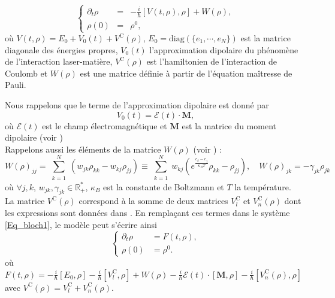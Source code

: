\documentclass[a4paper]{article}
\newcommand{\dt}{\partial_{t}}
\newcommand{\rC}{\mathrm{C}}
\newcommand{\diag}{{\mathrm{diag}}}
\begin{document}
\begin{itemize}
\begin{equation}
\left\{
\begin{array}{rcl}
\dt \rho &=& -\frac{i}{\hbar}\left[ V(t,\rho),\rho\right] + W(\rho), \\
\rho(0) &=& \rho^0,
\end{array}
 \right.
\label{Eq_bloch1}
\end{equation}
où $V(t,\rho) = E_0 + V_0(t) + V^{\rC}(\rho)$, $E_0 =\diag(\{ e_1,\cdots,e_N\})$  est la matrice diagonale des énergies propres, $V_0(t)$  l'approximation dipolaire du phénomène de l'interaction laser-matière,  $V^{\rC}(\rho)$ est l'hamiltonien de l'interaction de Coulomb et $W(\rho)$ est une matrice définie à partir de l'équation maîtresse de Pauli.


Nous rappelons que le terme de l'approximation dipolaire est donné par 
\begin{equation*}
 V_0(t)=\mathcal{E}(t)\cdot \textbf{M},
\end{equation*}  
où $\mathcal{E}(t)$ est le champ électromagnétique et $\textbf{M}$ est la matrice du moment dipolaire (voir \cite{Bidegaray-Bourgeade-Reignier01, Keita-Dicko24}) 
\\Rappelons aussi  les éléments de la matrice $W(\rho)$ (voir \cite{Bidegaray-Bourgeade-Reignier01,Keita-Dicko24}) :
\begin{equation*}
W(\rho)_{jj} = \sum_{\substack{k=1}}^{N} \left( w_{jk} \rho_{kk} - w_{kj} \rho_{jj} \right) \equiv \sum_{\substack{k=1}}^{N} w_{kj}\left( e^{\frac{e_k -e_j}{\kappa_B T}} \rho_{kk} -  \rho_{jj} \right) , \quad
W(\rho)_{jk} = -\gamma_{jk} \rho_{jk}
\end{equation*}
où $\forall j,k $, $w_{jk}, \gamma_{jk} \in \mathbb{R}_{+}^{*}$, $\kappa_B$ est la constante de Boltzmann et $T$ la température.
\\La matrice $V^{\rC}(\rho)$ correspond à la somme de deux matrices $ V_{l}^{\rC}$ et $V^{\rC}_{n} (\rho)$ dont les expressions sont données dans \cite{Bidegaray-Keita14}. En remplaçant ces termes dans le système \eqref{Eq_bloch1}, le modèle peut s'écrire ainsi
\begin{equation}
\left\{
\begin{aligned}
 \dt \rho &= F(t,\rho) , \\
\rho(0) &= \rho^0.
\end{aligned}
 \right.
\label{Eq_bloch2}
\end{equation}
où $F(t,\rho)=-\frac{i}{\hbar}\left[ E_0,\rho\right] -\frac{i}{\hbar}\left[ V_{l}^{\rC},\rho\right] + W(\rho) -\frac{i}{\hbar}\mathcal{E}(t) \cdot \left[ \textbf{M},\rho\right] - \frac{i}{\hbar}\left[ V^{\rC}_{n} (\rho),\rho\right]$ avec  $V^{\rC} (\rho)=V_{l}^{\rC}+V_{n}^{\rC}(\rho)$.

\end{itemize}
\end{document}
